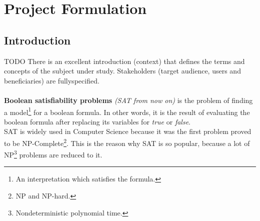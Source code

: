 
\chapter{Project Formulation} %

\label{Chapter1} %


\section{Introduction}

TODO
There is an excellent introduction
(context) that defines the terms
and concepts of the subject under
study. Stakeholders (target audience, users and beneficiaries)
are fullyspecified.
\\
\\
\textbf{Boolean satisfiability problems} \textit{(SAT from now on)} is the problem of finding a model\footnote{An interpretation which satisfies the formula.} for a boolean formula. In other words, it is the result of evaluating the boolean formula after replacing its variables for \emph{true} or \emph{false}. 
\\
SAT is widely used in Computer Science because it was the first problem proved to be NP-Complete\cite{Cook1971}\footnote{NP and NP-hard.}. This is the reason why SAT is so popular, because a lot of NP\footnote{Nondeterministic polynomial time.} problems are reduced to it.


